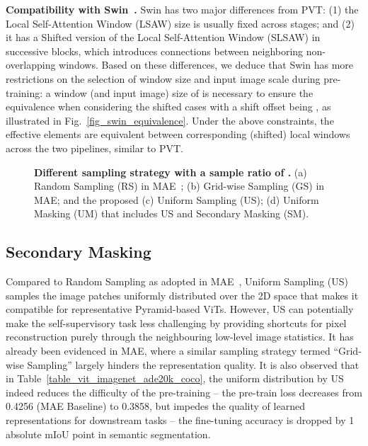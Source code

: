 \documentclass{article}
\begin{document}
\textbf{Compatibility with Swin~\cite{liu2021swin}.} Swin has two major differences from PVT: (1) the Local Self-Attention Window (LSAW) size is usually fixed across stages; and (2) it has a Shifted version of the Local Self-Attention Window (SLSAW) in successive blocks, which introduces connections between neighboring non-overlapping windows. Based on these differences, we deduce that Swin has more restrictions on the selection of window size and input image scale during pre-training: a window (and input image) size of  is necessary to ensure the equivalence when considering the shifted cases with a shift offset being , as illustrated in Fig.~\ref{fig_swin_equivalence}. Under the above constraints, the effective elements are equivalent between corresponding (shifted) local windows across the two pipelines, similar to PVT.



\begin{figure}[t]
	\vspace{0pt}
	\begin{center}
		\setlength{\fboxrule}{0pt}
	\end{center}	
	\vspace{-10pt}
	\caption{\textbf{Different sampling strategy with a sample ratio of .} (a) Random Sampling (RS) in MAE~\cite{he2021masked}; (b) Grid-wise Sampling (GS) in MAE; and the proposed (c) Uniform Sampling (US); (d) Uniform Masking (UM) that includes US and Secondary Masking (SM).
	}
	\label{fig_sampling_type}
	\vspace{-6pt}
\end{figure}


\subsection{Secondary Masking}
Compared to Random Sampling as adopted in MAE~\cite{he2021masked}, Uniform Sampling (US) samples the image patches uniformly distributed over the 2D space that makes it compatible for representative Pyramid-based ViTs. However, 
US can potentially make the self-supervisory task less challenging by providing shortcuts for pixel reconstruction purely through the neighbouring low-level image statistics.
It has already been evidenced in MAE, where a similar sampling strategy termed ``Grid-wise Sampling'' largely hinders the representation quality. It is also observed that in Table~\ref{table_vit_imagenet_ade20k_coco}, the uniform distribution by US indeed reduces the difficulty of the pre-training 
-- the pre-train loss decreases from 0.4256 (MAE Baseline) to 0.3858, but impedes the quality of learned representations for downstream tasks -- the fine-tuning accuracy is dropped by 1 absolute mIoU point in semantic segmentation.
\end{document}
